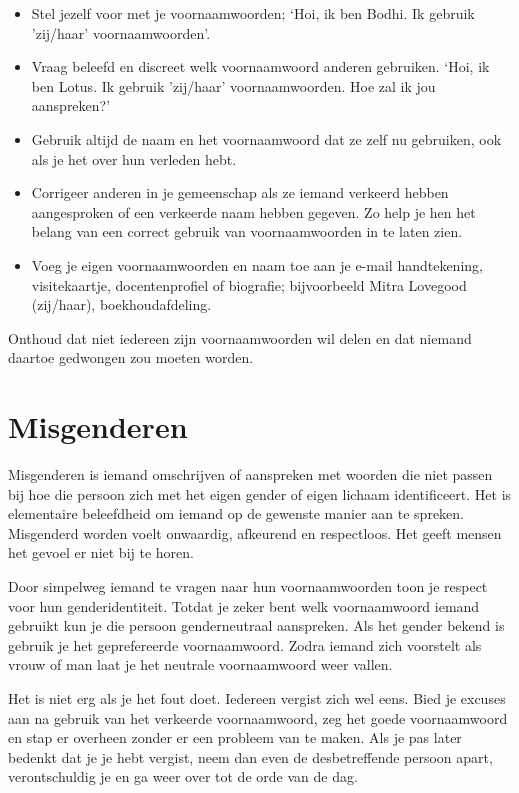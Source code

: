 \documentclass[12pt,openany]{book}
\begin{document}
\begin{itemize}
\setlength\itemsep{-0.3em}
\item Stel jezelf voor met je voornaamwoorden; ‘Hoi, ik ben Bodhi. Ik gebruik ’zij/haar’ voornaamwoorden’. 
\item Vraag beleefd en discreet welk voornaamwoord anderen gebruiken. ‘Hoi, ik ben Lotus. Ik gebruik ’zij/haar’ voornaamwoorden. Hoe zal ik jou aanspreken?’ 
\item Gebruik altijd de naam en het voornaamwoord dat ze zelf nu gebruiken, ook als je het over hun verleden hebt.
\item Corrigeer anderen in je gemeenschap als ze iemand verkeerd hebben aangesproken of een verkeerde naam hebben gegeven. Zo help je hen het belang van een correct gebruik van voornaamwoorden in te laten zien.
\item Voeg je eigen voornaamwoorden en naam toe aan je e-mail handtekening, visitekaartje, docentenprofiel of biografie; bijvoorbeeld Mitra Lovegood (zij/haar), boekhoudafdeling.
\end{itemize}

Onthoud dat niet iedereen zijn voornaamwoorden wil delen en dat niemand daartoe gedwongen zou moeten worden. 

\section*{Misgenderen}

Misgenderen is iemand omschrijven of aanspreken met woorden die niet passen bij hoe die persoon zich met het eigen gender of eigen lichaam identificeert. Het is elementaire beleefdheid om iemand op de gewenste manier aan te spreken. Misgenderd worden voelt onwaardig, afkeurend en respectloos. Het geeft mensen het gevoel er niet bij te horen. 

Door simpelweg iemand te vragen naar hun voornaamwoorden toon je respect voor hun genderidentiteit. Totdat je zeker bent welk voornaamwoord iemand gebruikt kun je die persoon genderneutraal aanspreken. Als het gender bekend is gebruik je het geprefereerde voornaamwoord. Zodra iemand zich voorstelt als vrouw of man laat je het neutrale voornaamwoord weer vallen.

Het is niet erg als je het fout doet. Iedereen vergist zich wel eens. Bied je excuses aan na gebruik van het verkeerde voornaamwoord, zeg het goede voornaamwoord en stap er overheen zonder er een probleem van te maken. Als je pas later bedenkt dat je je hebt vergist, neem dan even de desbetreffende persoon apart, verontschuldig je en ga weer over tot de orde van de dag.
\end{document}
